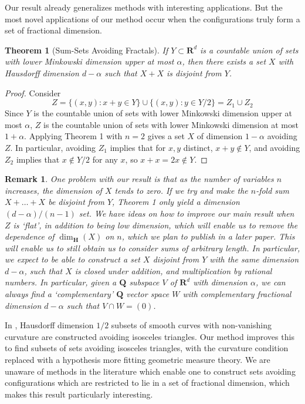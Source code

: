 \documentclass[dvipsnames]{article}
\theoremstyle{plain}
\theoremstyle{plain}
\newtheorem{theorem}{Theorem}
\newtheorem*{remark}{Remark}
\begin{document}
Our result already generalizes methods with interesting applications. But the most novel applications of our method occur when the configurations truly form a set of fractional dimension.

\begin{theorem}[Sum-Sets Avoiding Fractals]
	If $Y \subset \mathbf{R}^d$ is a countable union of sets with lower Minkowski dimension upper at most $\alpha$, then there exists a set $X$ with Hausdorff dimension $d-\alpha$ such that $X + X$ is disjoint from $Y$.
\end{theorem}
\begin{proof}
	Consider
	\[ Z = \{ (x,y): x + y \in Y \} \cup \{ (x,y): y \in Y/2 \} = Z_1 \cup Z_2 \]
	Since $Y$ is the countable union of sets with lower Minkowski dimension upper at most $\alpha$, $Z$ is the countable union of sets with lower Minkowski dimension at most $1 + \alpha$. Applying Theorem 1 with $n = 2$ gives a set $X$ of dimension $1 - \alpha$ avoiding $Z$. In particular, avoiding $Z_1$ implies that for $x,y$ distinct, $x + y \not \in Y$, and avoiding $Z_2$ implies that $x \not \in Y/2$ for any $x$, so $x + x = 2x \not \in Y$.
\end{proof}

\begin{remark}
	One problem with our result is that as the number of variables $n$ increases, the dimension of $X$ tends to zero. If we try and make the $n$-fold sum $X + \dots + X$ be disjoint from $Y$, Theorem 1 only yield a dimension $(d - \alpha)/(n-1)$ set. We have ideas on how to improve our main result when $Z$ is `flat', in addition to being low dimension, which will enable us to remove the dependence of $\dim_{\mathbf{H}}(X)$ on $n$, which we plan to publish in a later paper. This will enable us to still obtain us to consider sums of arbitrary length. In particular, we expect to be able to construct a set $X$ disjoint from $Y$ with the same dimension $d - \alpha$, such that $X$ is closed under addition, and multiplication by rational numbers. In particular, given a $\mathbf{Q}$ subspace $V$ of $\mathbf{R}^d$ with dimension $\alpha$, we can always find a `complementary' $\mathbf{Q}$ vector space $W$ with complementary fractional dimension $d - \alpha$ such that $V \cap W = (0)$.
\end{remark}

In \cite{MalabikaRob}, Hausdorff dimension $1/2$ subsets of smooth curves with non-vanishing curvature are constructed avoiding isosceles triangles. Our method improves this to find subsets of sets avoiding isosceles triangles, with the curvature condition replaced with a hypothesis more fitting geometric measure theory. We are unaware of methods in the literature which enable one to construct sets avoiding configurations which are restricted to lie in a set of fractional dimension, which makes this result particularly interesting.
\end{document}
